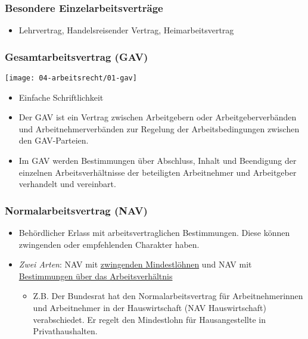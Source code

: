 \subsubsection{Besondere Einzelarbeitsverträge}
\begin{itemize}
    \item Lehrvertrag, Handelsreisender Vertrag, Heimarbeitsvertrag
\end{itemize}

\subsubsection{Gesamtarbeitsvertrag (GAV)}
\begin{center}
    \texttt{[image: 04-arbeitsrecht/01-gav]}
\end{center}

\begin{itemize}
    \item Einfache Schriftlichkeit
    \item Der GAV ist ein Vertrag zwischen \textcolor{OSTPink}{Arbeitgebern} oder \textcolor{OSTPink}{Arbeitgeberverbänden} und \textcolor{OSTPink}{Arbeitnehmerverbänden} zur Regelung der Arbeitsbedingungen zwischen den GAV-Parteien.
    \item Im GAV werden Bestimmungen über Abschluss, Inhalt und Beendigung der einzelnen Arbeitsverhältnisse der beteiligten Arbeitnehmer und Arbeitgeber verhandelt und vereinbart.
\end{itemize}

\subsubsection{Normalarbeitsvertrag (NAV)}
\begin{itemize}
    \item Behördlicher Erlass mit arbeitsvertraglichen Bestimmungen. Diese können zwingenden oder empfehlenden Charakter haben.
    \item \textit{Zwei Arten}: NAV mit \underline{zwingenden Mindestlöhnen} und NAV mit \underline{Bestimmungen über das Arbeitsverhältnis}
    \begin{itemize}
        \item Z.B. Der Bundesrat hat den Normalarbeitsvertrag für Arbeitnehmerinnen und Arbeitnehmer in der Hauswirtschaft (NAV Hauswirtschaft) verabschiedet. Er regelt den Mindestlohn für Hausangestellte in Privathaushalten.
    \end{itemize}
\end{itemize}

